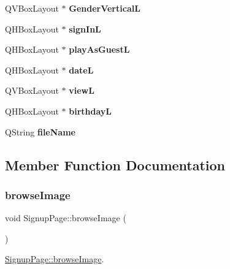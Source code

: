 \begin{DoxyCompactItemize}
Q\+V\+Box\+Layout $\ast$ {\bfseries Gender\+VerticalL}
\item 
\mbox{\label{classSignupPage_a32b6eaa85aab4d9e615c296b492f3862}} 
Q\+H\+Box\+Layout $\ast$ {\bfseries sign\+InL}
\item 
\mbox{\label{classSignupPage_ae5eb45fe83feec5e856432a74f29f4c9}} 
Q\+H\+Box\+Layout $\ast$ {\bfseries play\+As\+GuestL}
\item 
\mbox{\label{classSignupPage_adee077eed012679e45563885dc83b594}} 
Q\+H\+Box\+Layout $\ast$ {\bfseries dateL}
\item 
\mbox{\label{classSignupPage_afefe099a1d16cc6dc1f443bbf30d3e7a}} 
Q\+V\+Box\+Layout $\ast$ {\bfseries viewL}
\item 
\mbox{\label{classSignupPage_ab2bfa715b69026882fbb4c021fc5073d}} 
Q\+H\+Box\+Layout $\ast$ {\bfseries birthdayL}
\item 
\mbox{\label{classSignupPage_a0170b203c933877100bc6c476926dff5}} 
Q\+String {\bfseries file\+Name}
\end{DoxyCompactItemize}


\subsection{Member Function Documentation}
\mbox{\label{classSignupPage_a53027011ed8c2cf3e098468269bee0db}} 
\subsubsection{\texorpdfstring{browse\+Image}{browseImage}}
{\footnotesize\ttfamily void Signup\+Page\+::browse\+Image (\begin{DoxyParamCaption}{ }\end{DoxyParamCaption})\hspace{0.3cm}{\ttfamily [slot]}}



\hyperlink{classSignupPage_a53027011ed8c2cf3e098468269bee0db}{Signup\+Page\+::browse\+Image}. 

